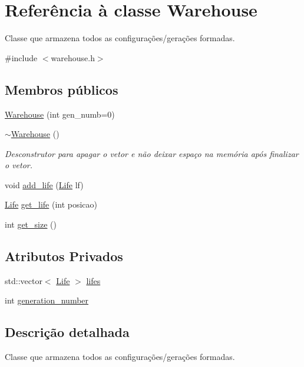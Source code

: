 \hypertarget{classWarehouse}{}\section{Referência à classe Warehouse}
\label{classWarehouse}


Classe que armazena todos as configurações/gerações formadas.  




{\ttfamily \#include $<$warehouse.\+h$>$}

\subsection*{Membros públicos}
\begin{DoxyCompactItemize}
\item 
\hyperlink{classWarehouse_ad34dcb3f59757a52f9084a973779e536}{Warehouse} (int gen\+\_\+numb=0)
\item 
\hyperlink{classWarehouse_a2ff79dc26f107b668d2e5fa7b2eeafc4}{$\sim$\+Warehouse} ()
\begin{DoxyCompactList}\small\item\em Desconstrutor para apagar o vetor e não deixar espaço na memória após finalizar o vetor. \end{DoxyCompactList}\item 
void \hyperlink{classWarehouse_a6ec18d658786c3f8f6577c31aac9481f}{add\+\_\+life} (\hyperlink{classLife}{Life} lf)
\item 
\hyperlink{classLife}{Life} \hyperlink{classWarehouse_a390439a84e9be046eb97db2ef42ff378}{get\+\_\+life} (int posicao)
\item 
int \hyperlink{classWarehouse_a1dde22e2b865dc1ab0b8d15f334322e6}{get\+\_\+size} ()
\end{DoxyCompactItemize}
\subsection*{Atributos Privados}
\begin{DoxyCompactItemize}
\item 
std\+::vector$<$ \hyperlink{classLife}{Life} $>$ \hyperlink{classWarehouse_a6b2896ac60f5230a41460d7febcc1fbf}{lifes}
\item 
int \hyperlink{classWarehouse_a379699c9693c068cdedbd54453e837fa}{generation\+\_\+number}
\end{DoxyCompactItemize}


\subsection{Descrição detalhada}
Classe que armazena todos as configurações/gerações formadas. 

